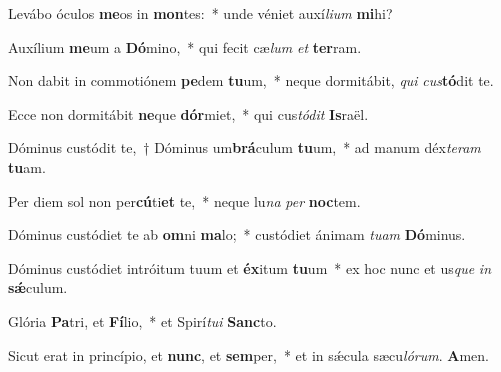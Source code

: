 \item Levábo óculos \textbf{me}os in \textbf{mon}tes:~* unde véniet auxí\textit{lium} \textbf{mi}hi?

\item Auxílium \textbf{me}um a \textbf{Dó}mino,~* qui fecit cæ\textit{lum} \textit{et} \textbf{ter}ram.

\item Non dabit in commotiónem \textbf{pe}dem \textbf{tu}um,~* neque dormitábit, \textit{qui} \textit{cus}\textbf{tó}dit te.

\item Ecce non dormitábit \textbf{ne}que \textbf{dór}miet,~* qui cus\textit{tódit} \textbf{Is}raël.

\item Dóminus custódit te,~† Dóminus um\textbf{brá}culum \textbf{tu}um,~* ad manum déx\textit{teram} \textbf{tu}am.

\item Per diem sol non per\textbf{cú}ti\textbf{et} te,~* neque lu\textit{na} \textit{per} \textbf{noc}tem.

\item Dóminus custódiet te ab \textbf{om}ni \textbf{ma}lo;~* custódiet ánimam \textit{tuam} \textbf{Dó}minus.

\item Dóminus custódiet intróitum tuum et \textbf{éx}itum \textbf{tu}um~* ex hoc nunc et us\textit{que} \textit{in} \textbf{sǽ}culum.

\item Glória \textbf{Pa}tri, et \textbf{Fí}lio,~* et Spirí\textit{tui} \textbf{Sanc}to.

\item Sicut erat in princípio, et \textbf{nunc}, et \textbf{sem}per,~* et in sǽcula sæcu\textit{lórum}. \textbf{A}men.